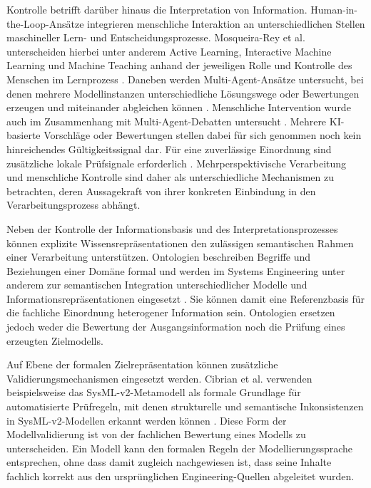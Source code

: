 Kontrolle betrifft darüber hinaus die Interpretation von Information.
Human-in-the-Loop-Ansätze integrieren menschliche Interaktion an
unterschiedlichen Stellen maschineller Lern- und Entscheidungsprozesse.
Mosqueira-Rey et al. unterscheiden hierbei unter anderem Active Learning,
Interactive Machine Learning und Machine Teaching anhand der jeweiligen Rolle
und Kontrolle des Menschen im Lernprozess \cite{MosqueiraRey2023}. Daneben
werden Multi-Agent-Ansätze untersucht, bei denen mehrere Modellinstanzen
unterschiedliche Lösungswege oder Bewertungen erzeugen und miteinander
abgleichen können \cite{Du2024}. Menschliche Intervention wurde auch im
Zusammenhang mit Multi-Agent-Debatten untersucht \cite{TriemDing2024}.
Mehrere KI-basierte Vorschläge oder Bewertungen stellen dabei für sich
genommen noch kein hinreichendes Gültigkeitssignal dar. Für eine zuverlässige
Einordnung sind zusätzliche lokale Prüfsignale erforderlich
\cite{Sunkaraneni2026}. Mehrperspektivische Verarbeitung und menschliche
Kontrolle sind daher als unterschiedliche Mechanismen zu betrachten, deren
Aussagekraft von ihrer konkreten Einbindung in den Verarbeitungsprozess
abhängt.

Neben der Kontrolle der Informationsbasis und des Interpretationsprozesses
können explizite Wissensrepräsentationen den zulässigen semantischen Rahmen
einer Verarbeitung unterstützen. Ontologien beschreiben Begriffe und
Beziehungen einer Domäne formal und werden im Systems Engineering unter
anderem zur semantischen Integration unterschiedlicher Modelle und
Informationsrepräsentationen eingesetzt
\cite{OrellanaMandrick2019,Lu2022}. Sie können damit eine Referenzbasis für
die fachliche Einordnung heterogener Information sein. Ontologien ersetzen
jedoch weder die Bewertung der Ausgangsinformation noch die Prüfung eines
erzeugten Zielmodells.

Auf Ebene der formalen Zielrepräsentation können zusätzliche
Validierungsmechanismen eingesetzt werden. Cibrian et al. verwenden
beispielsweise das SysML-v2-Metamodell als formale Grundlage für
automatisierte Prüfregeln, mit denen strukturelle und semantische
Inkonsistenzen in SysML-v2-Modellen erkannt werden können
\cite{Cibrian.2025b}. Diese Form der Modellvalidierung ist von der fachlichen
Bewertung eines Modells zu unterscheiden. Ein Modell kann den formalen Regeln
der Modellierungssprache entsprechen, ohne dass damit zugleich nachgewiesen
ist, dass seine Inhalte fachlich korrekt aus den ursprünglichen
Engineering-Quellen abgeleitet wurden.

